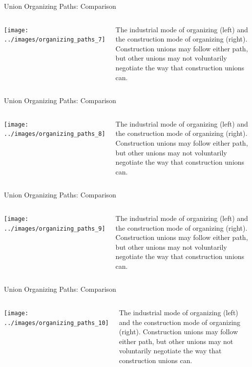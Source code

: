 \documentclass{beamer}
\begin{document}
\begin{frame}{Union Organizing Paths: Comparison}
  \begin{columns}
    \texttt{[image: ../images/organizing\_paths\_7]}

    The industrial mode of organizing (left) and the construction mode of organizing (right).\newline\newline
    Construction unions may follow either path, but other unions may not voluntarily negotiate the way that construction unions can.
    \end{columns}
\end{frame}

\begin{frame}{Union Organizing Paths: Comparison}
  \begin{columns}
    \texttt{[image: ../images/organizing\_paths\_8]}

    The industrial mode of organizing (left) and the construction mode of organizing (right).\newline\newline
    Construction unions may follow either path, but other unions may not voluntarily negotiate the way that construction unions can.
    \end{columns}
\end{frame}

\begin{frame}{Union Organizing Paths: Comparison}
  \begin{columns}
    \texttt{[image: ../images/organizing\_paths\_9]}

    The industrial mode of organizing (left) and the construction mode of organizing (right).\newline\newline
    Construction unions may follow either path, but other unions may not voluntarily negotiate the way that construction unions can.
    \end{columns}
\end{frame}

\begin{frame}{Union Organizing Paths: Comparison}
  \begin{columns}
    \texttt{[image: ../images/organizing\_paths\_10]}

    The industrial mode of organizing (left) and the construction mode of organizing (right).\newline\newline
    Construction unions may follow either path, but other unions may not voluntarily negotiate the way that construction unions can.
    \end{columns}
\end{frame}
\end{document}
